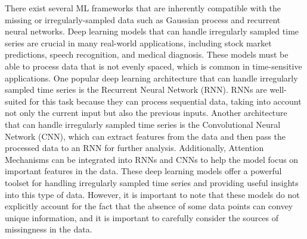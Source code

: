 \documentclass[journal,twoside,web]{ieeecolor}
\begin{document}
There exist several ML frameworks that are inherently compatible with the missing or irregularly-sampled data such as Gaussian process and recurrent neural networks.
Deep learning models that can handle irregularly sampled time series are crucial in many real-world applications, including stock market predictions, speech recognition, and medical diagnosis. These models must be able to process data that is not evenly spaced, which is common in time-sensitive applications. One popular deep learning architecture that can handle irregularly sampled time series is the Recurrent Neural Network (RNN). RNNs are well-suited for this task because they can process sequential data, taking into account not only the current input but also the previous inputs. 
Another architecture that can handle irregularly sampled time series is the Convolutional Neural Network (CNN), which can extract features from the data and then pass the processed data to an RNN for further analysis. Additionally, Attention Mechanisms can be integrated into RNNs and CNNs to help the model focus on important features in the data. These deep learning models offer a powerful toolset for handling irregularly sampled time series and providing useful insights into this type of data.
However, it is important to note that these models do not explicitly account for the fact that the absence of some data points can convey unique information, and it is important to carefully consider the sources of missingness in the data.

\end{document}
